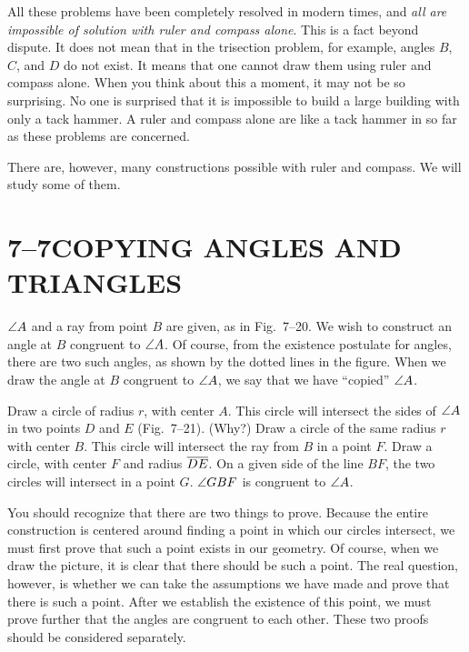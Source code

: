 \documentclass[11pt]{book}
\begin{document}
\FIGVIIEIGHTEENNINETEEN

All these problems have been completely resolved in modern times, and
\emph{all are impossible of solution with ruler and compass alone}. This is a
fact beyond dispute. It does not mean that in the trisection problem, for
example, angles $B$, $C$, and $D$ do not exist. It means that one cannot draw
them using ruler and compass alone. When you think about this a moment, it may
not be so surprising. No one is surprised that it is impossible to build a
large building with only a tack hammer. A ruler and compass alone are like a
tack hammer in so far as these problems are concerned.

There are, however, many constructions possible with ruler and compass. We will
study some of them.

\section*{7--7\quad COPYING ANGLES AND TRIANGLES}

$\angle A$ and a ray from point $B$ are given, as in Fig.~7--20. We wish to
construct an angle at $B$ congruent to $\angle A$. Of course, from the existence
postulate for angles, there are two such angles, as shown by the dotted lines
in the figure. When we draw the angle at $B$ congruent to $\angle A$, we say
that we have ``copied'' $\angle A$.

\FIGVIITWENTYTWENTYONE

\begin{construction}
Draw a circle of radius $r$, with center $A$. This circle will intersect the
sides of $\angle A$ in two points $D$ and $E$ (Fig.~7--21). (Why?) Draw a circle
of the same radius $r$ with center $B$. This circle will intersect the ray from
$B$ in a point $F$. Draw a circle, with center $F$ and radius $\overline{DE}$. On a
given side of the line $BF$, the two circles will intersect in a point $G$.
$\angle GBF$ is congruent to $\angle A$.
\end{construction}

You should recognize that there are two things to prove. Because the entire
construction is centered around finding a point in which our circles intersect,
we must first prove that such a point exists in our geometry. Of course, when
we draw the picture, it is clear that there should be such a point. The real
question, however, is whether we can take the assumptions we have made and
prove that there is such a point. After we establish the existence of this
point, we must prove further that the angles are congruent to each other. These
two proofs should be considered separately.
\end{document}
